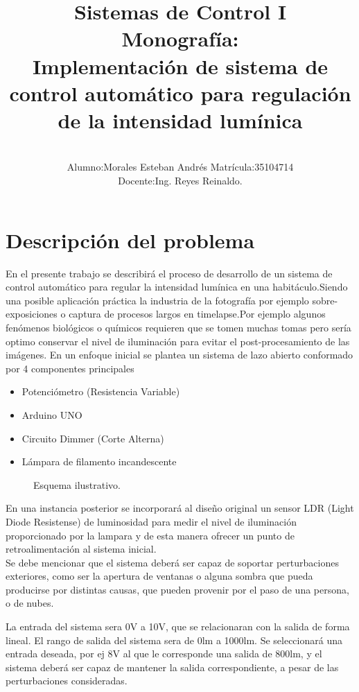 \documentclass[a4paper,11pt]{article}
\title{Sistemas de Control I \\ Monografía: 
\\Implementación de sistema de control automático para regulación de la intensidad lumínica\\}
\author{\\Alumno:Morales Esteban Andrés Matrícula:35104714\\
	  Docente:Ing. Reyes Reinaldo.}
\begin{document}
\maketitle
\newpage
\tableofcontents
\newpage
\section{Descripción del problema}
En el presente trabajo se describirá el proceso de desarrollo de un sistema de control automático para regular la intensidad lumínica en una habitáculo.Siendo una posible aplicación práctica la industria de la fotografía por ejemplo sobre-exposiciones o captura de procesos largos en timelapse.Por ejemplo algunos fenómenos biológicos o químicos requieren que se tomen muchas tomas pero sería optimo conservar el nivel de iluminación para evitar el post-procesamiento de las imágenes.
En un enfoque inicial se plantea un sistema de lazo abierto conformado por 4 componentes principales
\begin{itemize}
	\item Potenciómetro (Resistencia Variable)
	\item Arduino UNO
	\item Circuito Dimmer (Corte Alterna)
	\item Lámpara de filamento incandescente
\end{itemize}

\begin{figure}[H] %
	\caption{Esquema ilustrativo.}
	\label{fig:esquema_ilustra}
\end{figure} 

En una instancia posterior se incorporará al diseño original un sensor LDR (Light Diode Resistense) de luminosidad para medir el nivel de iluminación proporcionado por la lampara y de esta manera ofrecer un punto de retroalimentación al sistema inicial. 
\\
Se debe mencionar que el sistema deberá ser capaz de soportar perturbaciones exteriores, como ser la apertura de ventanas o alguna sombra que pueda producirse por distintas causas, que pueden provenir por el paso de una persona, o de nubes.

La entrada del sistema sera 0V a 10V, que se relacionaran con la salida de forma lineal. El rango de salida del sistema sera de 0lm a 1000lm. Se seleccionará una entrada deseada, por ej 8V al que le corresponde una salida de 800lm, y el sistema deberá ser capaz de mantener la salida correspondiente, a pesar de las perturbaciones consideradas.
\end{document}
